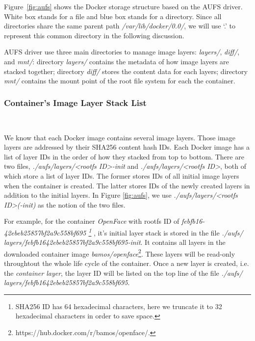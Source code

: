 Figure~\ref{fig:aufs} shows the Docker storage structure based on the AUFS driver. White box stands for a file and blue box stands for a directory. Since all directories share the same parent path \textit{/var/lib/docker/0.0/}, we will use `.' to represent this common directory in the following discussion. 

AUFS driver use three main directories to manage  image layers: \textit{layers/}, \textit{diff/}, and \textit{mnt/}:  directory \textit{layers/} contains the metadata of how image layers are stacked together; directory \textit{diff/} stores the content data for each layers; directory \textit{mnt/} contains the mount point of the root file system for each the container. 


\smallbreak
\subsubsection{Container's Image Layer Stack List}
~\smallbreak


We know that each Docker image contains several image layers. Those image layers are addressed by their SHA256 content hash IDs. Each Docker image has a list of layer IDs in the order of how they stacked from top to bottom.
There are two files, \textit{./aufs/layers/<rootfs ID>-init} and \textit{./aufs/layers/<rootfs ID>}, both of which store a list of layer IDs. The former stores IDs of all initial image layers when the container is created. The latter stores IDs of the newly created layers in addition to the initial layers.  In Figure \ref{fig:aufs}, we use \textit{./aufs/layers/<rootfs ID>(-init)} as the notion of the two files. 

For example, for the container \textit{OpenFace} with rootfs ID of 
\textit{
febfb16-42ebeb25857bf2a9c558bf695
\footnote{SHA256 ID has 64 hexadecimal characters, here we truncate it to 32 hexadecimal characters in order to save space.}
}, it's initial layer stack is stored in the file \textit{./aufs/ layers/febfb1642ebeb25857bf2a9c558bf695-init}. It  contains all layers in the downloaded container image \textit{bamos/openface}\footnote{https://hub.docker.com/r/bamos/openface/.}. These layers will be read-only throughtout the whole life cycle of the container. Once a new layer is created, i.e. the \textit{container layer}, the layer ID will be listed on the top line of the file \textit{./aufs/ layers/febfb1642ebeb25857bf2a9c558bf695}.

